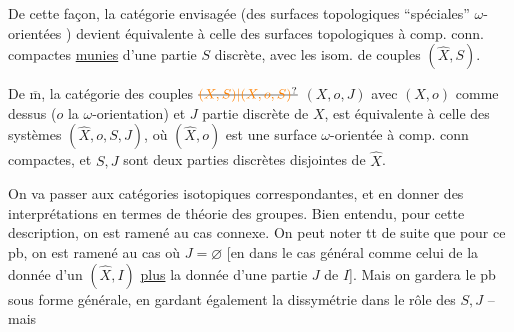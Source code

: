 De cette façon, la catégorie envisagée (des surfaces topologiques ``spéciales'' $\omega$-orientées ) devient équivalente à celle des surfaces topologiques  à comp. conn. compactes \uline{munies} d'une partie  $S$ discrète, avec les isom. de couples $(\hat X,S)$.

De $\overline{\mathrm m}$, la catégorie des couples $\deleted{\unsure{(X,S)|(X,o,S)}}$ $(X,o,J)$ avec $(X,o)$ comme dessus ($o$ la $\omega$-orientation) et $J$ partie discrète de $X$, est équivalente à celle des systèmes $(\hat X,o,S,J)$, où $(\hat X,o)$ est une surface $\omega$-orientée à comp. conn compactes,
et $S,J$ sont deux parties discrètes disjointes de $\hat X$.

On va  passer aux catégories isotopiques correspondantes, et en donner des interprétations en termes de théorie des groupes. Bien entendu, pour cette description, on est ramené au cas connexe. On peut  noter tt de suite que pour ce pb, on est ramené au cas où $J=\varnothing$ [en  dans le cas général comme celui de la donnée d'un $(\hat X,I)$ \uline{plus} la donnée d'une partie $J$ de $I$]. Mais on gardera le pb sous  forme générale, en gardant également la dissymétrie dans le rôle des $S,J$ -- mais
